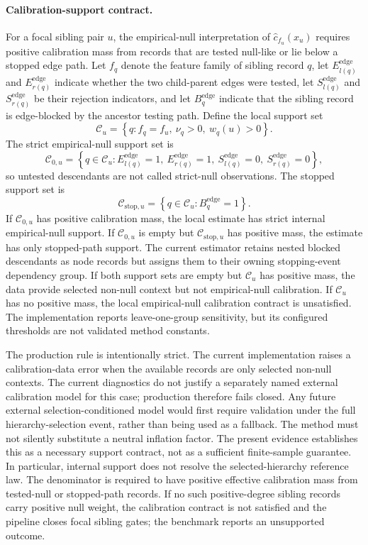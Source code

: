 \paragraph{Calibration-support contract.}
For a focal sibling pair $u$, the empirical-null interpretation of
\(\hat c_{f_u}(x_u)\) requires positive calibration mass from records that are
tested null-like or lie below a stopped edge path.
Let $f_q$ denote the feature family of sibling record $q$, let
$E_{l(q)}^{\mathrm{edge}}$ and $E_{r(q)}^{\mathrm{edge}}$ indicate whether the
two child-parent edges were tested, let $S_{l(q)}^{\mathrm{edge}}$ and
$S_{r(q)}^{\mathrm{edge}}$ be their rejection indicators, and let
$B_q^{\mathrm{edge}}$ indicate that the sibling record is edge-blocked by the
ancestor testing path. Define the local support set
\[
\mathcal C_u
=
\left\{
q:
f_q=f_u,\ \nu_q>0,\ w_q(u)>0
\right\}.
\]
The strict empirical-null support set is
\[
\mathcal C_{0,u}
=
\left\{
q\in\mathcal C_u:
E_{l(q)}^{\mathrm{edge}}=1,\
E_{r(q)}^{\mathrm{edge}}=1,\
S_{l(q)}^{\mathrm{edge}}=0,\
S_{r(q)}^{\mathrm{edge}}=0
\right\},
\]
so untested descendants are not called strict-null observations. The stopped
support set is
\[
\mathcal C_{\mathrm{stop},u}
=
\left\{
q\in\mathcal C_u:
B_q^{\mathrm{edge}}=1
\right\}.
\]
If $\mathcal C_{0,u}$ has positive calibration mass, the local estimate has
strict internal empirical-null support. If $\mathcal C_{0,u}$ is empty but
$\mathcal C_{\mathrm{stop},u}$ has positive mass, the estimate has only
stopped-path support. The current estimator retains nested blocked descendants
as node records but assigns them to their owning stopping-event dependency
group. If both support sets are empty but $\mathcal C_u$ has positive
mass, the data provide selected non-null context but not empirical-null
calibration. If $\mathcal C_u$ has no positive mass, the local empirical-null
calibration contract is unsatisfied. The implementation reports
leave-one-group sensitivity, but its configured thresholds are not validated
method constants.

The production rule is intentionally strict. The current implementation raises
a calibration-data error when the available records are only selected non-null
contexts. The current diagnostics do not justify a separately named external
calibration model for this case; production therefore fails closed. Any future
external selection-conditioned model would first require validation under the
full hierarchy-selection event, rather than being used as a fallback. The method
must not silently substitute a neutral inflation factor.
The present evidence establishes this as a necessary support contract, not as a
sufficient finite-sample guarantee. In particular, internal support does not
resolve the selected-hierarchy reference law.
The denominator is required to have positive effective calibration mass from
tested-null or stopped-path records. If no such positive-degree sibling
records carry positive null weight, the calibration contract is not satisfied
and the pipeline closes focal sibling gates; the benchmark reports an unsupported outcome.

